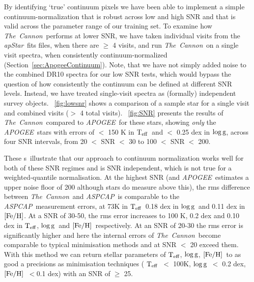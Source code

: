 \documentclass[12pt, preprint]{aastex}
\newcommand{\sectionname}{Section}
\newcommand{\figurenames}{\figurename s}
\newcommand{\tc}{\textsl{The~Cannon}}
\newcommand{\apogee}{\textsl{APOGEE}}
\newcommand{\aspcap}{\textsl{ASPCAP}}
\newcommand{\apstar}{\textsl{apStar}}
\newcommand{\teff}{\mbox{$\rm T_{eff}$}}
\newcommand{\feh}{\mbox{$\rm [Fe/H]$}}
\newcommand{\logg}{\mbox{$\rm \log g$}}
\begin{document}
By identifying `true' continuum pixels we have been able to implement a simple continuum-normalization that is robust across low and high SNR and that is valid across the parameter range of our training set. To examine how \tc\ performs at lower SNR, we have taken individual visits from the \apstar\ fits files, when there are $\ge$ 4 visits, and run \tc\ on a single visit spectra, when consistently continuum-normalized (\sectionname~\ref{sec:ApogeeContinuum}). Note, that we have not simply added noise to the combined DR10 spectra for our low SNR tests, which would bypass the question of how consistently the continuum can be defined at different SNR levels. Instead, we have treated single-visit spectra as (formally) independent survey objects. \figurename~\ref{fig:lowsnr} shows a comparison of a sample star for a single visit and combined visits ($>$ 4 total visits). \figurename~\ref{fig:SNR} presents the results of \tc\ compared to \apogee\ for these stars, showing \textit{only} the \apogee\ stars with errors of $<$ 150 K in \teff\ and $<$ 0.25 dex in \logg, across four SNR intervals, from 20 $<$ SNR $<$ 30 to 100 $<$ SNR $<$ 200.

These \figurenames\ illustrate that our approach to continuum normalization works well for both of these SNR regimes and is SNR independent, which is not true for a weighted-quantile normalisation. At the highest SNR (and \apogee\ estimates a upper noise floor of 200 although stars do measure above this), the rms difference between \tc\ and \aspcap\ is comparable to the \aspcap\ measurement errors, at 73K in \teff\, 0.18 dex in \logg\ and 0.11 dex in \feh. At a SNR of 30-50, the rms error increases to 100 K, 0.2 dex and 0.10 dex in \teff, \logg\ and \feh\, respectively. At an SNR of 20-30 the rms error is significantly higher and here the internal errors of \tc\ become comparable to typical minimisation methods and at SNR $<$ 20 exceed them. With this method we can return stellar parameters of \teff, \logg, \feh\ to as good a precisions as minimisation techniques ( \teff\ $<$ 100K, \logg\ $<$ 0.2 dex, \feh\ $< $0.1 dex) with an SNR of $\ge$ 25. 
 
\end{document}
